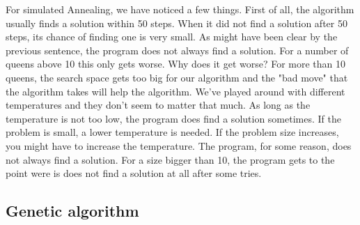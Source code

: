 \documentclass{article}
\begin{document}
	For simulated Annealing, we have noticed a few things. First of all, the algorithm usually finds a solution within 50 steps. When it did not find a solution after 50 steps, its chance of finding one is very small. As might have been clear by the previous sentence, the program does not always find a solution. For a number of queens above 10 this only gets worse. Why does it get worse? For more than 10 queens, the search space gets too big for our algorithm and the "bad move" that the algorithm takes will help the algorithm. We've played around with different temperatures and they don't seem to matter that much. As long as the temperature is not too low, the program does find a solution sometimes. If the problem is small, a lower temperature is needed. If the problem size increases, you might have to increase the temperature. The program, for some reason, does not always find a solution. For a size bigger than 10, the program gets to the point were is does not find a solution at all after some tries. 
	
	
	\subsection*{Genetic algorithm}
	
\end{document}
